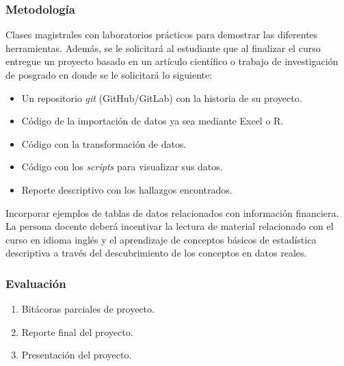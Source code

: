 \begin{refsection}
\subsubsection*{Metodología}

Clases magistrales con laboratorios prácticos para demostrar las diferentes herramientas. Además, se le solicitará al estudiante que al finalizar el curso entregue un proyecto basado en un artículo científico o trabajo de investigación de posgrado en donde se le solicitará lo siguiente:

\begin{itemize}
\item Un repositorio \emph{git} (GitHub/GitLab) con la historia de su proyecto.
\item Código de la importación de datos ya sea mediante Excel o R.
\item Código con la transformación de datos.
\item Código con los \emph{scripts} para visualizar sus datos.
\item Reporte descriptivo con los hallazgos encontrados.
\end{itemize}

Incorporar ejemplos de tablas de datos relacionados con información financiera. La persona docente deberá incentivar la lectura de material relacionado con el curso en idioma inglés y el aprendizaje de conceptos básicos de estadística descriptiva a través del descubrimiento de los conceptos en datos reales.

\subsubsection*{Evaluación}

\begin{enumerate}
\item Bitácoras parciales de proyecto.
\item Reporte final del proyecto.
\item Presentación del proyecto.
\end{enumerate}

\nocite{CH21}
\nocite{DataCarpentrySheets}
\nocite{GW14hopr}
\nocite{Kel20}
\nocite{PR16}
\nocite{WG17}
\nocite{Xie15}

\printcursosbibliography

\end{refsection}
